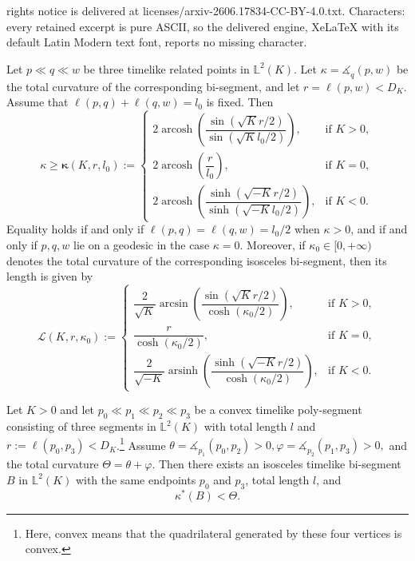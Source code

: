 \documentclass[10pt,a4paper]{amsart}
\DeclareMathOperator{\arcosh}{arcosh}
\newcommand{\lm}[1]{\mathbb{L}^2(#1)}
\newcommand{\ma}{\ensuremath{\measuredangle}}
\begin{document}
rights notice is delivered at licenses/arxiv-2606.17834-CC-BY-4.0.txt. Characters: every retained excerpt is pure ASCII, so the delivered engine, XeLaTeX with its default Latin Modern text font, reports no missing character.
\begin{lemma}
\label{lem: bi-segment and rigidity}
Let $p\ll q\ll w$ be three timelike related points in $\lm{K}$. 
Let $\kappa=\ma_{q}(p,w)$ be the total curvature of the corresponding bi-segment, and let $r=\ell(p,w)<D_K$. 
Assume that $\ell(p,q)+\ell(q,w)=l_0$ is fixed. 
Then
\begin{equation*}
\label{total bound}
\kappa\geq \bm{\kappa}(K,r,l_0):=
\begin{cases}
2\arcosh\left(\dfrac{\sin(\sqrt{K}r/2)}{\sin(\sqrt{K}l_0/2)}\right), 
& \mathrm{if}\,\,K>0,\\[1.2ex]
2\arcosh\left(\dfrac{r}{l_0}\right), 
& \mathrm{if}\,\,K=0,\\[1.2ex]
2\arcosh\left(\dfrac{\sinh(\sqrt{-K}r/2)}{\sinh(\sqrt{-K}l_0/2)}\right), 
& \mathrm{if}\,\,K<0.
\end{cases}
\end{equation*}
Equality holds if and only if $\ell(p,q)=\ell(q,w)=l_0/2$ when $\kappa>0$, and if and only if $p,q,w$ lie on a geodesic in the case $\kappa=0$. Moreover, if $\kappa_0\in[0,+\infty)$ denotes the total curvature of the corresponding isosceles bi-segment, then its length is given by
\begin{equation}
\label{length bound}
\mathcal{L}(K,r,\kappa_0):=
\begin{cases}
\dfrac{2}{\sqrt{K}}\arcsin\left(\dfrac{\sin(\sqrt{K}r/2)}{\cosh(\kappa_0/2)}\right), & \mathrm{if}\,\,K>0,\\[1.2ex]
\dfrac{r}{\cosh(\kappa_0/2)}, & \mathrm{if}\,\,K=0,\\[1.2ex]
\dfrac{2}{\sqrt{-K}}\operatorname{arsinh}\left(\dfrac{\sinh(\sqrt{-K}r/2)}{\cosh(\kappa_0/2)}\right), & \mathrm{if}\,\,K<0.
\end{cases}
\end{equation}
\end{lemma}

\begin{lemma}
\label{lem:positive_tri_segment_estimate}
Let $K>0$ and let $p_0\ll p_1\ll p_2\ll p_3$ be a convex timelike poly-segment consisting of three segments in $\lm{K}$ with total length $l$ and $ r:=\ell(p_0,p_3) < D_K$.\footnote{Here, convex means that the quadrilateral generated by these four vertices is convex.} Assume $\theta=\ma_{p_1}(p_0,p_2)>0,
\varphi=\ma_{p_2}(p_1,p_3)>0,$ and the total curvature $\Theta=\theta+\varphi$.
Then there exists an isosceles timelike bi-segment $B$ in $\lm{K}$ with the same endpoints
$p_0$ and $p_3$, total length $l$, and
\[
\kappa^*(B)< \Theta .
\]
\end{lemma}
\end{document}
